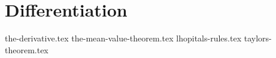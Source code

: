 \chapter{Differentiation}
{the-derivative.tex}
{the-mean-value-theorem.tex}
{lhopitals-rules.tex}
{taylors-theorem.tex}
